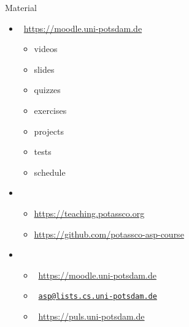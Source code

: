 \begin{frame}{Material}
  \bigskip
  \begin{itemize}\itemsep 0pt
  \item {}      \ \url{https://moodle.uni-potsdam.de}
        \begin{itemize}
        \item {videos}
        \item {slides}
        \item {quizzes}
        \item {exercises}
        \item {projects}
        \item {tests}
        \item {schedule}
        \end{itemize}
  \item {}
    \begin{itemize}
    \item \url{https://teaching.potassco.org}
    \item \url{https://github.com/potassco-asp-course}
    \end{itemize}
    \medskip
  \item {}
    \begin{itemize}
    \item {}         \ \url{https://moodle.uni-potsdam.de}
    \item {}          \ \href{mailto:asp@lists.cs.uni-potsdam.de}{\texttt{asp@lists.cs.uni-potsdam.de}}
    \item {} \ \url{https://puls.uni-potsdam.de}
    \end{itemize}
    \medskip
  \end{itemize}
\end{frame}
%
